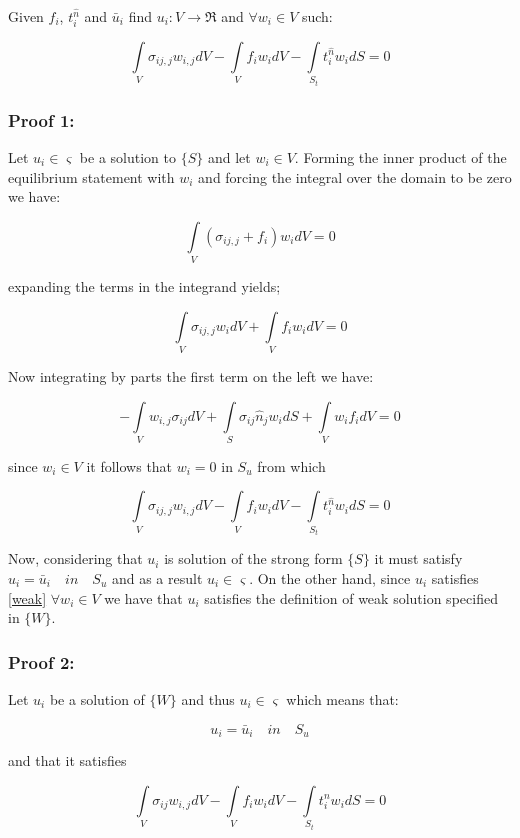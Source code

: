 Given $f_i$, $t_i^{\hat n}$ and ${\bar u_i}$ find ${u_i}:V \to \Re$ and $\forall {w_i} \in V$ such:

\[\int\limits_V {{\sigma _{ij,j}}{w_{i,j}}dV - \int\limits_V {{f_i}{w_i}dV}  - \int\limits_{{S_t}} {t_i^{\hat n}} } {w_i}dS = 0\]

\subsubsection*{Proof 1:}
Let $u_i \in \varsigma $ be a solution to $\{S\}$ and let $w_i \in V $. Forming the inner product of the equilibrium statement with $w_i$ and forcing the integral over the domain to be zero we have:

\[\int\limits_V {\left( {{\sigma _{ij,j}} + {f_i}} \right){w_i}} dV = 0\]

expanding the terms in the integrand yields;

\[\int\limits_V {{\sigma _{ij,j}}{w_i}dV + \int\limits_V {{f_i}{w_i}dV = 0} } \]

Now integrating by parts the first term on the left we have:

\[ - \int\limits_V {{w_{i,j}}{\sigma _{ij}}dV}  + \int\limits_S {{\sigma _{ij}}{{\hat n}_j}{w_i}dS}  + \int\limits_V {{w_i}{f_i}dV = 0} \]

since $w_i \in V$ it follows that $w_i = 0$ in $S_u$ from which

\begin{equation}\label{weak}
\int\limits_V {{\sigma _{ij,j}}{w_{i,j}}dV - \int\limits_V {{f_i}{w_i}dV}  - \int\limits_{{S_t}} {t_i^{\hat n}} } {w_i}dS = 0
\end{equation}


Now, considering that $u_i$ is solution of the strong form $\{S\}$ it must satisfy $u_i = \bar u_{i} \quad in \quad S_u$ and as a result $u_i \in \varsigma$. On the other hand, since $u_i$ satisfies \cref{weak} $\forall {w_i} \in V$ we have that $u_i$ satisfies the definition of weak solution specified in $\{ W \}$.

\subsubsection*{Proof 2:}
Let $u_i$ be a solution of $\{W\}$ and thus $u_i \in \varsigma$ which means that:

\[u_i = \bar u_{i} \quad in \quad S_u\]

and that it satisfies

\[\int\limits_V {{\sigma _{ij}}{w_{i,j}}dV - \int\limits_V {{f_i}{w_i}dV - \int\limits_{{S_t}} {t_i^n} } } {w_i}dS = 0\]

